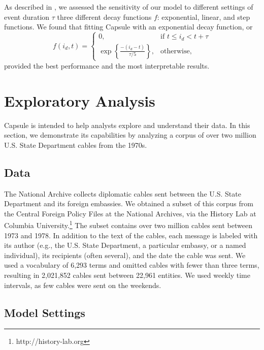 As described in , we assessed the sensitivity of our model to different settings of event duration $\tau$ three different decay functions $f$: exponential, linear, and step functions.  We found that fitting Capsule with an exponential decay function, or
\begin{equation}
f(i_d, t) =
\begin{cases}
    0,			& \text{if } t \le i_d < t + \tau\\
    \exp\left\{\frac{-(i_d - t)}{\tau/5}\right\},          & \text{otherwise,}
\end{cases}
\label{eq:f}
\end{equation}
provided the best performance and the most interpretable results.



\section{Exploratory Analysis}
\label{sec:eval}

Capsule is intended to help analysts explore and understand their
data. In this section, we demonstrate its capabilities by analyzing a
corpus of over two million U.S. State Department cables from the
1970s.

\subsection{Data}

The National Archive collects diplomatic cables sent between the
U.S. State Department and its foreign embassies. We obtained a subset
of this corpus from the Central Foreign Policy Files at the National
Archives, via the History Lab at Columbia
University.\footnote{http://history-lab.org} The subset contains over
two million cables sent between 1973 and 1978. In addition to the text
of the cables, each message is labeled with its author (e.g., the
U.S. State Department, a particular embassy, or a named individual),
its recipients (often several), and the date the cable was sent. We
used a vocabulary of 6,293 terms and omitted cables with fewer than
three terms, resulting in 2,021,852 cables sent between 22,961
entities. We used weekly time intervals, as few cables were sent on
the weekends.

\subsection{Model Settings}

